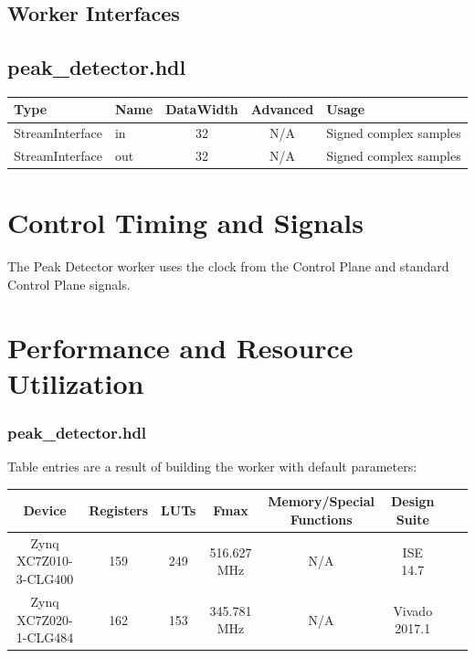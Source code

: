 \documentclass{article}
\def\comp{peak\_detector}
\def\Comp{Peak Detector}
\begin{document}
\begin{landscape}
\section*{Worker Interfaces}
\subsection*{\comp.hdl}
\begin{scriptsize}
\begin{tabular}{|M{2cm}|M{1.5cm}|c|c|M{12cm}|}
             \hline
             Type            & Name & DataWidth & Advanced                & Usage                  \\
             \hline
             StreamInterface & in   & 32        & N/A & Signed complex samples \\
            \hline
            StreamInterface & out  & 32        & N/A & Signed complex samples \\
            \hline
\end{tabular}
\end{scriptsize}
\end{landscape}

\section*{Control Timing and Signals}
\begin{flushleft}
The {\Comp} worker uses the clock from the Control Plane and standard Control Plane signals.
\end{flushleft}

\section*{Performance and Resource Utilization}
	\subsubsection*{\comp.hdl}
    Table entries are a result of building the worker with default parameters:\
        \newline\newline
        \scriptsize
        \begin{tabular}{|c|c|c|c|c|c|c|c|}
                \hline
                \rowcolor{blue}
                Device & Registers & LUTs & Fmax & Memory/Special Functions & Design Suite \\
                \hline
                Zynq XC7Z010-3-CLG400 & 159 & 249 & 516.627 MHz & N/A  & ISE 14.7 \\
                \hline
                Zynq XC7Z020-1-CLG484    & 162    & 153 & 345.781 MHz & N/A & Vivado 2017.1 \\
                \hline
        \end{tabular}
\end{document}
